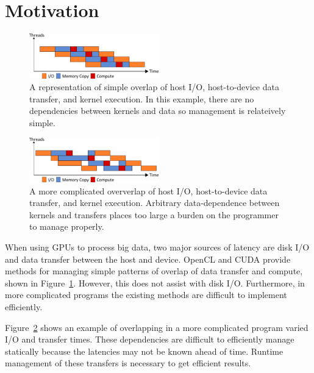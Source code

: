\section{Motivation}

\begin{figure}
  \centering
    \includegraphics[width=0.5\textwidth]{fig/ord.png}
  \caption{A representation of simple overlap of host I/O, host-to-device data
           transfer, and kernel execution. In this example, there are no
           dependencies between kernels and data so management is relateively
           simple.}
  \label{fig:ord}
\end{figure}

\begin{figure}
  \centering
    \includegraphics[width=0.5\textwidth]{fig/unord.png}
  \caption{A more complicated oververlap of host I/O, host-to-device data
           transfer, and kernel execution. Arbitrary data-dependence between
           kernels and transfers places too large a burden on the programmer
           to manage properly.}
  \label{fig:unord}
\end{figure}

When using GPUs to process big data, two major sources of latency are disk I/O
and data transfer between the host and device. OpenCL and CUDA provide methods
for managing simple patterns of overlap of data transfer and compute, shown in
Figure~\ref{fig:ord}. However, this does not assist with disk I/O.
Furthermore, in more complicated programs the existing methods are difficult to
implement efficiently. 

Figure~\ref{fig:unord} shows an example of overlapping in a more complicated
program varied I/O and transfer times. These dependencies are difficult to
efficiently manage statically because the latencies may not be known ahead of
time. Runtime management of these transfers is necessary to get efficient
results.

 

